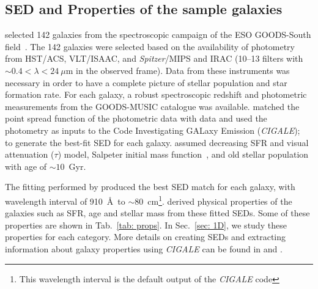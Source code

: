  \subsection{SED and Properties of the sample galaxies} 
     selected 142 galaxies from the spectroscopic campaign of the ESO GOODS-South field~\citep{Vanzella05, Vanzella06, Vanzella08}.
    The 142 galaxies were selected based on the availability of photometry from HST/ACS, VLT/ISAAC, and {\it Spitzer}/MIPS and IRAC (10--13 filters with $\sim 0.4<\lambda<24~\mu$m in the observed frame).
   Data from these instruments was necessary in order to have a complete picture of stellar population and star formation rate. 
    For each galaxy, a robust spectroscopic redshift and photometric measurements from the GOODS-MUSIC catalogue \citep{Santini09} was available.
    matched the point spread function of the photometric data with  data and used the photometry as inputs to the Code Investigating GALaxy Emission ({\em CIGALE});~\citep[][hereafter N09]{Noll09} to generate the best-fit SED for each galaxy. %
    assumed decreasing SFR and visual attenuation ($\tau$) model, Salpeter initial mass function~\citep{Salpeter55}, and old stellar population with age of $\sim 10$~Gyr.%
   

    The fitting performed by  produced the best SED match for each galaxy, with wavelength interval of 910~\AA~to $\sim 80$~cm\footnote{This wavelength interval is the default output of the {\em CIGALE} code}.
     derived physical properties of the galaxies such as SFR, age and stellar mass from these fitted SEDs. %
    Some of these properties are shown in Tab.~\ref{tab: props}.
    In Sec.~\ref{sec: 1D}, we study these properties for each category.
    More details on creating SEDs and extracting information about galaxy properties using {\em CIGALE} can be found in  and .
    
